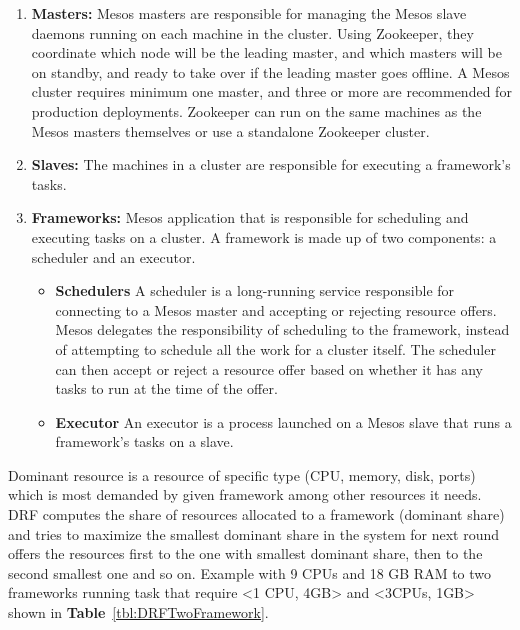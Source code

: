 \documentclass[12pt,oneside,openright,a4paper]{cpe-english-project}
\begin{document}
\begin{enumerate}
  \item \textbf{Masters: } Mesos masters are responsible for managing the Mesos slave daemons running on each machine in the cluster. Using Zookeeper, they coordinate which node will be the leading master, and which masters will be on standby, and ready to take over if the leading master goes offline. A Mesos cluster requires minimum one master, and three or more are recommended for production deployments. Zookeeper can run on the same machines as the Mesos masters themselves or use a standalone Zookeeper cluster. 
  \item \textbf{Slaves: } The machines in a cluster are responsible for executing a framework’s tasks.
  \item \textbf{Frameworks: } Mesos application that is responsible for scheduling and executing tasks on a cluster. A framework is made up of two components: a scheduler and an executor.
  \begin{itemize}
      \item \textbf{Schedulers} A scheduler is a long-running service responsible for connecting to a Mesos master and accepting or rejecting resource offers. Mesos delegates the responsibility of scheduling to the framework, instead of attempting to schedule all the work for a cluster itself. The scheduler can then accept or reject a resource offer based on whether it has any tasks to run at the time of the offer. 
      \item \textbf{Executor} An executor is a process launched on a Mesos slave that runs a framework’s tasks on a slave.
  \end{itemize}
\end{enumerate}

\hspace{10mm}Dominant resource is a resource of specific type (CPU, memory, disk, ports) which is most demanded by given framework among other resources it needs. DRF computes the share of resources allocated to a framework (dominant share) and tries to maximize the smallest dominant share in the system for next round offers the resources first to the one with smallest dominant share, then to the second smallest one and so on. \cite{drf} Example with 9 CPUs and 18 GB RAM to two frameworks running task that require <1 CPU, 4GB> and <3CPUs, 1GB> shown in \textbf{Table}~\ref{tbl:DRFTwoFramework}.
\end{document}
